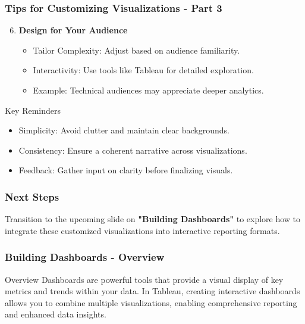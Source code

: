 \documentclass[aspectratio=169]{beamer}
\begin{document}
\begin{frame}[fragile]
    \frametitle{Tips for Customizing Visualizations - Part 3}
    \begin{enumerate}
        \setcounter{enumi}{5} %
        \item \textbf{Design for Your Audience}
            \begin{itemize}
                \item Tailor Complexity: Adjust based on audience familiarity.
                \item Interactivity: Use tools like Tableau for detailed exploration.
                \item Example: Technical audiences may appreciate deeper analytics.
            \end{itemize}
    \end{enumerate}
    
    \begin{block}{Key Reminders}
        \begin{itemize}
            \item Simplicity: Avoid clutter and maintain clear backgrounds.
            \item Consistency: Ensure a coherent narrative across visualizations.
            \item Feedback: Gather input on clarity before finalizing visuals.
        \end{itemize}
    \end{block}
\end{frame}

\begin{frame}[fragile]
    \frametitle{Next Steps}
    Transition to the upcoming slide on \textbf{"Building Dashboards"} to explore how to integrate these customized visualizations into interactive reporting formats.
\end{frame}

\begin{frame}[fragile]
    \frametitle{Building Dashboards - Overview}
    \begin{block}{Overview}
        Dashboards are powerful tools that provide a visual display of key metrics and trends within your data. 
        In Tableau, creating interactive dashboards allows you to combine multiple visualizations, enabling comprehensive reporting and enhanced data insights.
    \end{block}
\end{frame}
\end{document}
